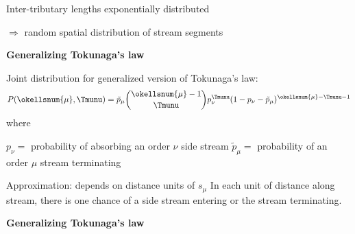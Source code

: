\begin{frame}[label=]
\begin{frame}[label=]
\begin{frame}[label=]
\begin{frame}[label=]
\begin{frame}[label=]
\begin{frame}[label=]
\begin{frame}[label=]
\begin{frame}[label=]
\begin{frame}[label=]
\begin{frame}[label=]
\begin{frame}[label=]
\begin{frame}[label=]
\begin{frame}[label=]
\begin{frame}[label=]
\begin{frame}[label=]
\begin{frame}[label=]
\begin{frame}[label=]
\begin{frame}[label=]
\begin{frame}[label=]
\begin{frame}[label=]
\begin{frame}[label=]
\begin{frame}[label=]
\begin{frame}[label=]
\begin{frame}[label=]
\begin{frame}[label=]
\begin{frame}[label=]
\begin{frame}[label=]
\begin{frame}[label=]
\begin{frame}[label=]
\begin{frame}[label=]
\begin{frame}[label=]
\begin{frame}[label=]
\begin{frame}[label=]
\begin{frame}[label=]
\begin{frame}[label=]
\begin{frame}[label=]
\begin{frame}[label=]
\begin{frame}[label=]
\begin{frame}[label=]
\begin{frame}[label=]
\begin{frame}[label=]
\begin{frame}[label=]
\begin{frame}[label=]
\begin{frame}[label=]
\begin{frame}[label=]
\begin{frame}[label=]
\begin{frame}[label=]
\begin{frame}[label=]
\begin{frame}[label=]
\begin{frame}[label=]
\begin{frame}[label=]
\begin{frame}[label=]
\begin{frame}[label=]
\begin{frame}[label=]
    Inter-tributary lengths exponentially distributed
  
    $\Rightarrow$ random spatial distribution of stream segments
  

\begin{frame}[label=]
  \textbf{Generalizing Tokunaga's law}

  
   Joint distribution for generalized version
    of Tokunaga's law:
    $$
    P(\okellsnum{\mu},\Tmunu) = \tilde{p}_{\mu}
    \binom{\okellsnum{\mu} - 1}{\Tmunu}
    p_{\nu}^{\Tmunu}
    ( 1 - p_\nu - \tilde{p}_{\mu})^{\okellsnum{\mu} - \Tmunu - 1}
    $$
    where 
    
     $p_\nu = $ probability of absorbing an order $\nu$ side stream
     $\tilde{p}_{\mu} = $ probability of an order $\mu$ stream terminating 
    
   Approximation: depends on distance units of $s_\mu$
   In each unit of distance along stream, there is 
    one chance of a side stream entering or the stream terminating.
  


\begin{frame}[label=]
  \textbf{Generalizing Tokunaga's law}

  
   

\end{frame}
\end{frame}
\end{frame}
\end{frame}
\end{frame}
\end{frame}
\end{frame}
\end{frame}
\end{frame}
\end{frame}
\end{frame}
\end{frame}
\end{frame}
\end{frame}
\end{frame}
\end{frame}
\end{frame}
\end{frame}
\end{frame}
\end{frame}
\end{frame}
\end{frame}
\end{frame}
\end{frame}
\end{frame}
\end{frame}
\end{frame}
\end{frame}
\end{frame}
\end{frame}
\end{frame}
\end{frame}
\end{frame}
\end{frame}
\end{frame}
\end{frame}
\end{frame}
\end{frame}
\end{frame}
\end{frame}
\end{frame}
\end{frame}
\end{frame}
\end{frame}
\end{frame}
\end{frame}
\end{frame}
\end{frame}
\end{frame}
\end{frame}
\end{frame}
\end{frame}
\end{frame}
\end{frame}
\end{frame}
\end{frame}

